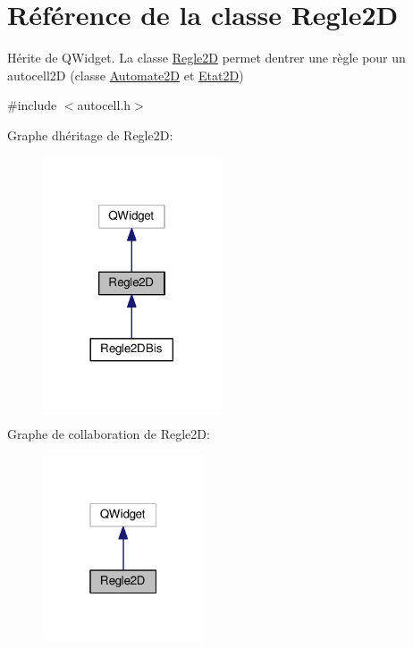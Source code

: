 \hypertarget{class_regle2_d}{}\section{Référence de la classe Regle2D}
\label{class_regle2_d}


Hérite de Q\+Widget. La classe \hyperlink{class_regle2_d}{Regle2D} permet d\textquotesingle{}entrer une règle pour un autocell2D (classe \hyperlink{class_automate2_d}{Automate2D} et \hyperlink{class_etat2_d}{Etat2D})  




{\ttfamily \#include $<$autocell.\+h$>$}



Graphe d\textquotesingle{}héritage de Regle2D\+:\nopagebreak
\begin{figure}[H]
\begin{center}
\leavevmode
\includegraphics[width=149pt]{class_regle2_d__inherit__graph}
\end{center}
\end{figure}


Graphe de collaboration de Regle2D\+:\nopagebreak
\begin{figure}[H]
\begin{center}
\leavevmode
\includegraphics[width=135pt]{class_regle2_d__coll__graph}
\end{center}
\end{figure}
